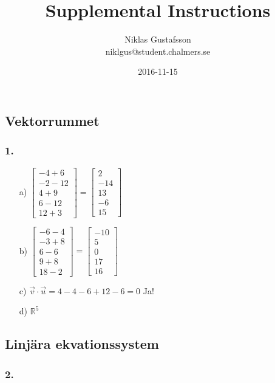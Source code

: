 \documentclass{article}
\title{Supplemental Instructions}
\author{Niklas Gustafsson \\ 
		\small{niklgus@student.chalmers.se}
}
\date{
      2016-11-15
     }
\begin{document}
\maketitle
\subsection*{Vektorrummet}
\subsubsection*{1.}
\begin{itemize}
\item[a) ] $\begin{bmatrix}-4+6\\-2-12\\4+9\\6-12\\12+3\end{bmatrix}=\begin{bmatrix}2\\-14\\13\\-6\\15\end{bmatrix}$
\item[b) ] $\begin{bmatrix}-6-4\\-3+8\\6-6\\9+8\\18-2\end{bmatrix}=\begin{bmatrix}-10\\5\\0\\17\\16\end{bmatrix} $
\item[c) ] $\vec{v}\cdot\vec{u}=4-4-6+12-6=0$ Ja!
\item[d) ] $\mathbb{R}^5$
\end{itemize}


\subsection*{Linjära ekvationssystem}
\subsubsection*{2.}
\end{document}
